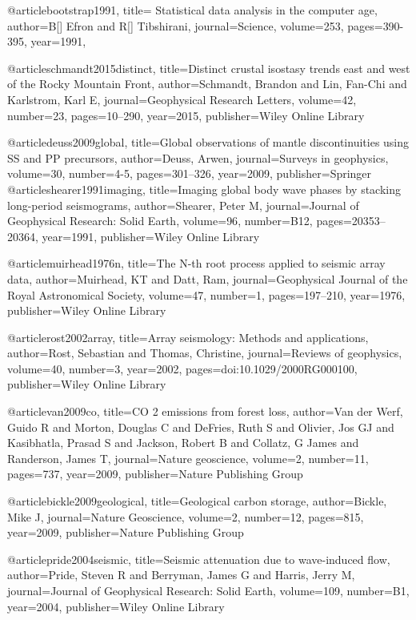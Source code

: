 @article{bootstrap1991,
  title={ Statistical data analysis in the computer age},
  author={B[] Efron and R[] Tibshirani},
  journal={Science},
  volume={253},
  pages={390-395},
  year={1991},
}




@article{schmandt2015distinct,
  title={Distinct crustal isostasy trends east and west of the Rocky Mountain Front},
  author={Schmandt, Brandon and Lin, Fan-Chi and Karlstrom, Karl E},
  journal={Geophysical Research Letters},
  volume={42},
  number={23},
  pages={10--290},
  year={2015},
  publisher={Wiley Online Library}
}


@article{deuss2009global,
  title={Global observations of mantle discontinuities using SS and PP precursors},
  author={Deuss, Arwen},
  journal={Surveys in geophysics},
  volume={30},
  number={4-5},
  pages={301--326},
  year={2009},
  publisher={Springer}
}
@article{shearer1991imaging,
  title={Imaging global body wave phases by stacking long-period seismograms},
  author={Shearer, Peter M},
  journal={Journal of Geophysical Research: Solid Earth},
  volume={96},
  number={B12},
  pages={20353--20364},
  year={1991},
  publisher={Wiley Online Library}
}

@article{muirhead1976n,
  title={The N-th root process applied to seismic array data},
  author={Muirhead, KT and Datt, Ram},
  journal={Geophysical Journal of the Royal Astronomical Society},
  volume={47},
  number={1},
  pages={197--210},
  year={1976},
  publisher={Wiley Online Library}
}

@article{rost2002array,
  title={Array seismology: Methods and applications},
  author={Rost, Sebastian and Thomas, Christine},
  journal={Reviews of geophysics},
  volume={40},
  number={3},
  year={2002},
  pages={doi:10.1029/2000RG000100},
  publisher={Wiley Online Library}
}


@article{van2009co,
  title={CO 2 emissions from forest loss},
  author={Van der Werf, Guido R and Morton, Douglas C and DeFries, Ruth S and Olivier, Jos GJ and Kasibhatla, Prasad S and Jackson, Robert B and Collatz, G James and Randerson, James T},
  journal={Nature geoscience},
  volume={2},
  number={11},
  pages={737},
  year={2009},
  publisher={Nature Publishing Group}
}

@article{bickle2009geological,
  title={Geological carbon storage},
  author={Bickle, Mike J},
  journal={Nature Geoscience},
  volume={2},
  number={12},
  pages={815},
  year={2009},
  publisher={Nature Publishing Group}
}

@article{pride2004seismic,
  title={Seismic attenuation due to wave-induced flow},
  author={Pride, Steven R and Berryman, James G and Harris, Jerry M},
  journal={Journal of Geophysical Research: Solid Earth},
  volume={109},
  number={B1},
  year={2004},
  publisher={Wiley Online Library}
}

